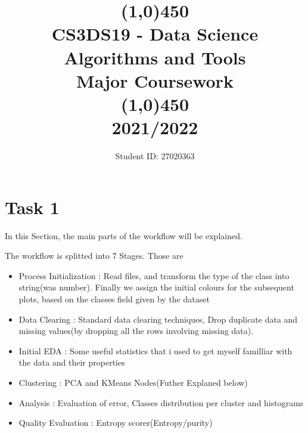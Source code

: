 \documentclass[11pt]{article}
\title{\line(1,0){450}\\ CS3DS19 - Data Science Algorithms and Tools \\ \large{Major Coursework }  \\\line(1,0){450} \\2021/2022}
\author{Student ID: 27020363}
\begin{document}
	\maketitle
	\pagebreak
	
	\section{Task 1}
		
		In this Section, the  main parts of the workflow will be explained.

		The workflow is splitted into 7 Stages. Those are
		\begin{itemize}
			\item Process Initialization : Read files, and transform the type of the class into string(was number). Finally we assign the initial colours for the subsequent plots, based on the classes field given by the dataset
			\item Data Clearing : Standard data clearing techniques, Drop duplicate data and missing values(by dropping all the rows involving missing data).
			\item Initial EDA : Some useful statistics that i used to get myself familliar with the data and their properties
			\item Clustering : PCA and KMeans Nodes(Futher Explaned below)
			\item Analysis : Evaluation of error, Classes distribution per cluster and histograms
			\item Quality Evaluation : Entropy scorer(Entropy/purity)
		\end{itemize}
	
\end{document}
